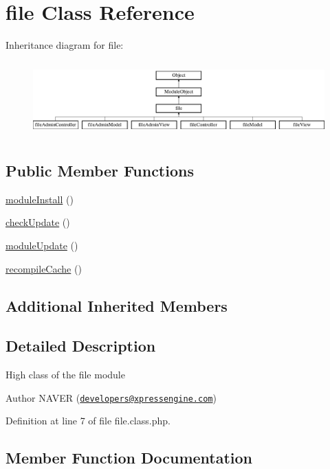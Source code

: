 \hypertarget{classfile}{}\section{file Class Reference}
\label{classfile}
Inheritance diagram for file\+:\begin{figure}[H]
\begin{center}
\leavevmode
\includegraphics[height=2.916667cm]{classfile}
\end{center}
\end{figure}
\subsection*{Public Member Functions}
\begin{DoxyCompactItemize}
\item 
\hyperlink{classfile_a5e8c34a5d2187f2a332a88e112c90bdc}{module\+Install} ()
\item 
\hyperlink{classfile_ad9420bb93d958cdd9741a27137f9cf2a}{check\+Update} ()
\item 
\hyperlink{classfile_a13a5d2858426d421327f744555fec4fb}{module\+Update} ()
\item 
\hyperlink{classfile_abdd4624fd45f101cdf4009eeda3cc1ab}{recompile\+Cache} ()
\end{DoxyCompactItemize}
\subsection*{Additional Inherited Members}


\subsection{Detailed Description}
High class of the file module \begin{DoxyAuthor}{Author}
N\+A\+V\+ER (\href{mailto:developers@xpressengine.com}{\tt developers@xpressengine.\+com}) 
\end{DoxyAuthor}


Definition at line 7 of file file.\+class.\+php.



\subsection{Member Function Documentation}
\hypertarget{classfile_ad9420bb93d958cdd9741a27137f9cf2a}{}\label{classfile_ad9420bb93d958cdd9741a27137f9cf2a} 
